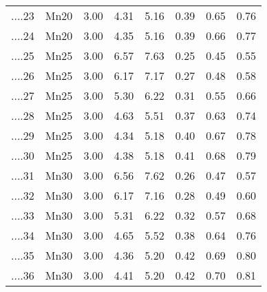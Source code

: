 \begin{table}[ht]
\begin{tabular}{rlrrrrrr}
  ....23 & Mn20 & 3.00 & 4.31 & 5.16 & 0.39 & 0.65 & 0.76 \\ 
  ....24 & Mn20 & 3.00 & 4.35 & 5.16 & 0.39 & 0.66 & 0.77 \\ 
  ....25 & Mn25 & 3.00 & 6.57 & 7.63 & 0.25 & 0.45 & 0.55 \\ 
  ....26 & Mn25 & 3.00 & 6.17 & 7.17 & 0.27 & 0.48 & 0.58 \\ 
  ....27 & Mn25 & 3.00 & 5.30 & 6.22 & 0.31 & 0.55 & 0.66 \\ 
  ....28 & Mn25 & 3.00 & 4.63 & 5.51 & 0.37 & 0.63 & 0.74 \\ 
  ....29 & Mn25 & 3.00 & 4.34 & 5.18 & 0.40 & 0.67 & 0.78 \\ 
  ....30 & Mn25 & 3.00 & 4.38 & 5.18 & 0.41 & 0.68 & 0.79 \\ 
  ....31 & Mn30 & 3.00 & 6.56 & 7.62 & 0.26 & 0.47 & 0.57 \\ 
  ....32 & Mn30 & 3.00 & 6.17 & 7.16 & 0.28 & 0.49 & 0.60 \\ 
  ....33 & Mn30 & 3.00 & 5.31 & 6.22 & 0.32 & 0.57 & 0.68 \\ 
  ....34 & Mn30 & 3.00 & 4.65 & 5.52 & 0.38 & 0.64 & 0.76 \\ 
  ....35 & Mn30 & 3.00 & 4.36 & 5.20 & 0.42 & 0.69 & 0.80 \\ 
  ....36 & Mn30 & 3.00 & 4.41 & 5.20 & 0.42 & 0.70 & 0.81 \\ 
   \hline
\end{tabular}
\end{table}
